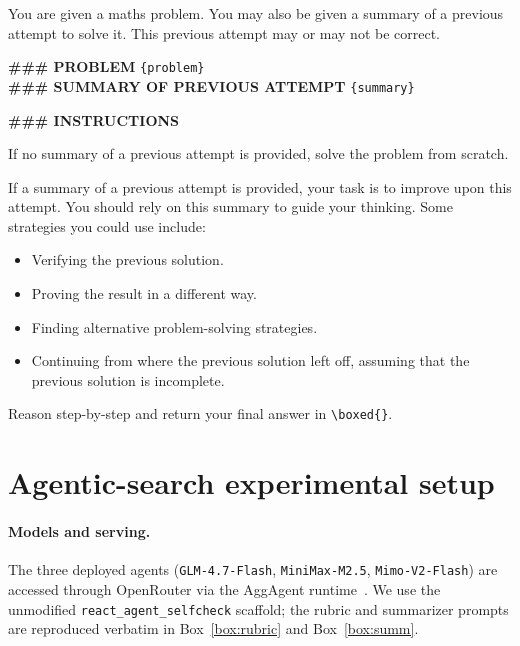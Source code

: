 \documentclass{article}
\begin{document}
  \begin{tcolorbox}[
  colback=teal!5,
  colframe=teal!70!black,
  coltitle=white,
  title={\textbf{Continuation prompt} (issued to $\pi$ at the start of every round, with $\tilde y$ filled in if available)},
  label=box:math_continuation,
  fonttitle=\small,
  boxrule=0.5pt,
  arc=2pt,        %
  left=6pt, right=6pt  %
  ]
  \small
You are given a maths problem. You may also be given a summary of a previous attempt to solve it. This previous attempt may or may not be correct.

  \medskip
  \textbf{\#\#\# PROBLEM} \texttt{\{problem\}}\\
  \textbf{\#\#\# SUMMARY OF PREVIOUS ATTEMPT} \texttt{\{summary\}}

  \medskip
  \textbf{\#\#\# INSTRUCTIONS}

If no summary of a previous attempt is provided, solve the problem from scratch.

If a summary of a previous attempt is provided, your task is to improve upon this attempt. You should rely on this summary to guide your thinking. Some strategies you could use include:
  \begin{itemize}\setlength\itemsep{0pt}\setlength\topsep{0pt}
  \item Verifying the previous solution.
  \item Proving the result in a different way.
  \item Finding alternative problem-solving strategies.
  \item Continuing from where the previous solution left off, assuming that the previous solution is incomplete.
  \end{itemize}

Reason step-by-step and return your final answer in \verb|\boxed{}|.
  \end{tcolorbox}


\clearpage

\section{Agentic-search experimental setup}
\label{appendix:search_setup}

\paragraph{Models and serving.} The three deployed agents
(\texttt{GLM-4.7-Flash}, \texttt{MiniMax-M2.5}, \texttt{Mimo-V2-Flash})
are accessed through OpenRouter via the AggAgent
runtime~\citep{lee2026agenticaggregationparallelscaling}. We use the
unmodified
\texttt{react\_agent\_selfcheck} scaffold; the rubric and summarizer
prompts are reproduced verbatim in Box~\ref{box:rubric} and
Box~\ref{box:summ}.
\end{document}
